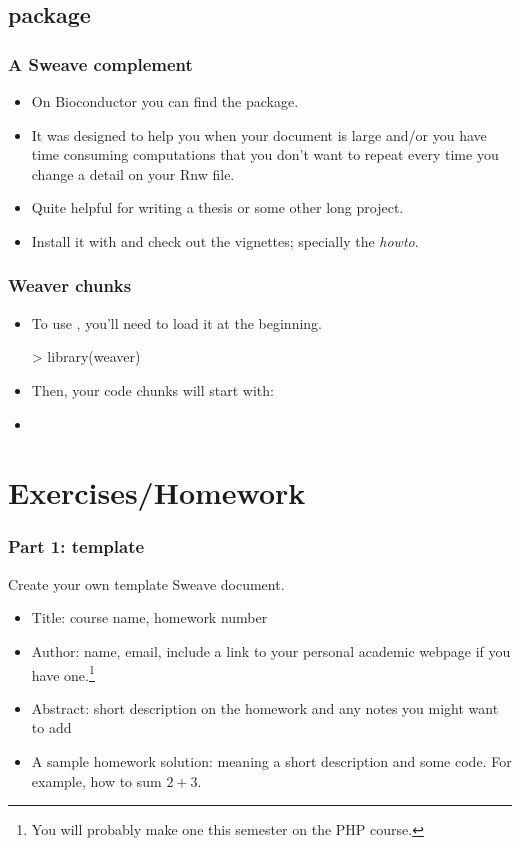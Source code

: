\subsection{ package}

\begin{frame}[allowframebreaks]
  \frametitle{A Sweave complement}
  \begin{itemize}
  \item On Bioconductor you can find the  package.
  \item It was designed to help you when your document is large and/or you have time consuming computations that you don't want to repeat every time you change a detail on your Rnw file.
  \item Quite helpful for writing a thesis or some other long project.
  \item Install it with  and check out the vignettes; specially the \emph{howto}. 
  \end{itemize}
\end{frame}

\begin{frame}
  \frametitle{Weaver  chunks}
  \begin{itemize}
  \item To use , you'll need to load it at the beginning.
\begin{Schunk}
\begin{Sinput}
> library(weaver)
\end{Sinput}
\end{Schunk}
  \item Then, your  code chunks will start with:
  \item {}
  \end{itemize}
\end{frame}


\section{Exercises/Homework}

\begin{frame}[allowframebreaks]
  \frametitle{Part 1: template}
  Create your own template Sweave document.
  \begin{itemize}
  \item Title: course name, homework number
  \item Author: name, email, include a link to your personal academic webpage if you have one.\footnote{You will probably make one this semester on the PHP course.}
  \item Abstract: short description on the homework and any notes you might want to add
  \item A sample homework solution: meaning a short description and some code. For example, how to sum $2 + 3$.
  \end{itemize}
\end{frame}

